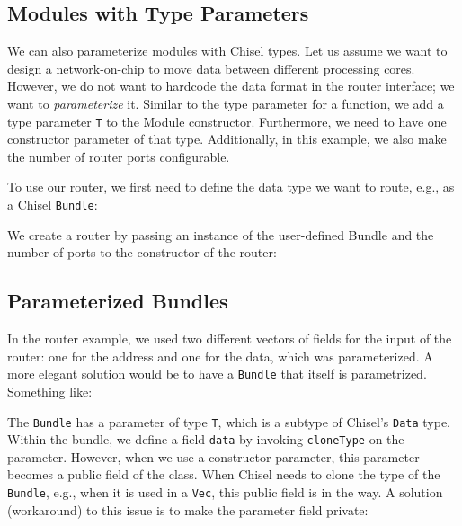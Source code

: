 \documentclass[%
    10pt,
    headinclude, footexclude,
    openright, %
    notitlepage,
    cleardoubleempty,
    headsepline,
    pointlessnumbers,
    bibtotoc, idxtotoc,
    ]{scrbook}
\newcommand{\code}[1]{{\small{\texttt{#1}}}}
\begin{document}

\subsection{Modules with Type Parameters}

We can also parameterize modules with Chisel types.
Let us assume we want to design a network-on-chip to move data between
different processing cores. However, we do not want to hardcode the
data format in the router interface; we want to \emph{parameterize} it.
Similar to the type parameter for a function, we add a type parameter \code{T}
to the Module constructor. Furthermore, we need to have one constructor
parameter of that type. Additionally, in this example, we also make the number
of router ports configurable.


\noindent To use our router, we first need to define the data type we want to route, e.g.,
as a Chisel \code{Bundle}:


\noindent We create a router by passing an instance of the user-defined Bundle and
the number of ports to the constructor of the router:


\subsection{Parameterized Bundles}

In the router example, we used two different vectors of fields for the input
of the router: one for the address and one for the data, which was parameterized.
A more elegant solution would be to have a \code{Bundle} that itself
is parametrized. Something like:


The \code{Bundle} has a parameter of type \code{T}, which is a subtype
of Chisel's \code{Data} type.
Within the bundle, we define a field \code{data} by invoking \code{cloneType}
on the parameter.
However, when we use a constructor parameter, this parameter becomes a
public field of the class. When Chisel needs to clone the type of the \code{Bundle},
e.g., when it is used in a \code{Vec}, this public field is in the way.
A solution (workaround) to this issue is to make the parameter field private:
\end{document}

